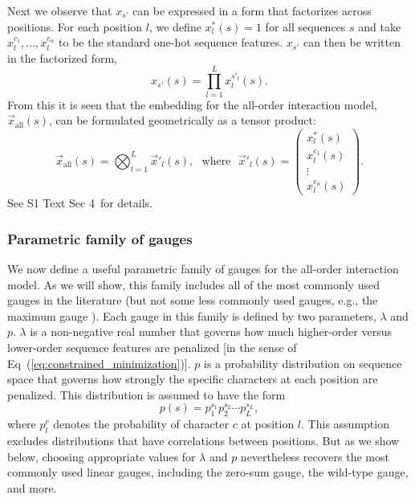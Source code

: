 \documentclass[10pt,letterpaper]{article}
\newcommand{\eq}[1]{Eq\ (\ref{#1})}
\newcommand{\si}[1]{{S1 Text Sec #1}}
\begin{document}
Next we observe that $x_{s'}$ can be expressed in a form that factorizes across positions. For each position $l$, we define $x^*_l(s)=1$ for all sequences $s$ and take $x^{c_1}_l, \ldots, x^{c_\alpha}_l$ to be the standard one-hot sequence features. $x_{s'}$ can then be written in the factorized form,
\begin{equation}
    x_{s'}(s) = \prod_{l=1}^L x_l^{s'_l}(s).
\end{equation}
From this it is seen that the embedding for the all-order interaction model, $\vec{x}_\textrm{all}(s)$, can be formulated geometrically as a tensor product: 
\begin{equation}
\vec{x}_\textrm{all}(s) = \bigotimes_{l=1}^L \vec{x}'_l(s),
\textrm{~~where~~} 
    \vec{x}'_l(s) = \left(\!\! 
    \begin{array}{c} 
        x^*_l(s) \\ 
        x_l^{c_1}(s) \\
        \vdots \\
        x_l^{c_\alpha}(s)
    \end{array} \!\! \right).
\end{equation}
See \si{4}\ for details. 


\subsubsection*{Parametric family of gauges}

We now define a useful parametric family of gauges for the all-order interaction model. As we will show, this family includes all of the most commonly used gauges in the literature (but not some less commonly used gauges, e.g., the maximum gauge \cite{Berg:1987wu, Kinney:2010tn}). Each gauge in this family is defined by two parameters, $\lambda$ and $p$. $\lambda$ is a non-negative real number that governs how much higher-order versus lower-order sequence features are penalized [in the sense of \eq{eq:constrained_minimization}]. $p$ is a probability distribution on sequence space that governs how strongly the specific characters at each position are penalized. This distribution is assumed to have the form
\begin{equation}
    p(s) = p_1^{s_1} p_2^{s_2} \cdots p_L^{s_L}, \label{eq:p_of_s}
\end{equation}
where $p_l^c$ denotes the probability of character $c$ at position $l$. This assumption excludes distributions that have correlations between positions. But as we show below, choosing appropriate values for $\lambda$ and $p$ nevertheless recovers the most commonly used linear gauges, including the zero-sum gauge, the wild-type gauge, and more.
\end{document}
